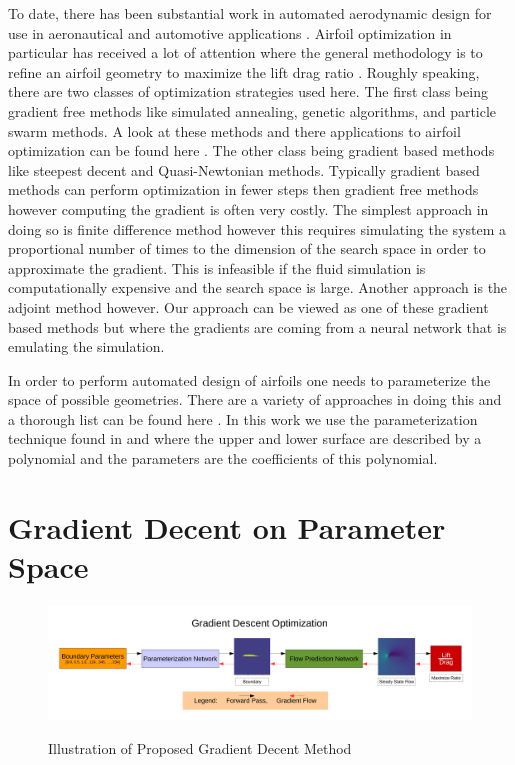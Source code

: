 \documentclass{article} %
\begin{document}
To date, there has been substantial work in automated aerodynamic design for use in aeronautical and automotive applications \cite{ando2010automotive} \cite{demultiplexer}. Airfoil optimization in particular has received a lot of attention where the general methodology is to refine an airfoil geometry to maximize the lift drag ratio \cite{drela1998pros}. Roughly speaking, there are two classes of optimization strategies used here. The first class being gradient free methods like simulated annealing, genetic algorithms, and particle swarm methods. A look at these methods and there applications to airfoil optimization can be found here \cite{mukesh2012application}. The other class being gradient based methods like steepest decent and Quasi-Newtonian methods. Typically gradient based methods can perform optimization in fewer steps then gradient free methods however computing the gradient is often very costly. The simplest approach in doing so is finite difference method however this requires simulating the system a proportional number of times to the dimension of the search space in order to approximate the gradient. This is infeasible if the fluid simulation is computationally expensive and the search space is large. Another approach is the adjoint method however. Our approach can be viewed as one of these gradient based methods but where the gradients are coming from a neural network that is emulating the simulation.

In order to perform automated design of airfoils one needs to parameterize the space of possible geometries. There are a variety of approaches in doing this and a thorough list can be found here \cite{salunke2014airfoil}. In this work we use the parameterization technique found in \cite{lane2009surface} and \cite{hilton2007universal} where the upper and lower surface are described by a polynomial and the parameters are the coefficients of this polynomial.

\section{Gradient Decent on Parameter Space}

\begin{figure}[h]
\begin{center}
\includegraphics[scale=0.34]{./gradient_descent_optimization.pdf}
\label{gradient_descent_optimization}
\end{center}
\caption{Illustration of Proposed Gradient Decent Method}
\end{figure}
\end{document}
